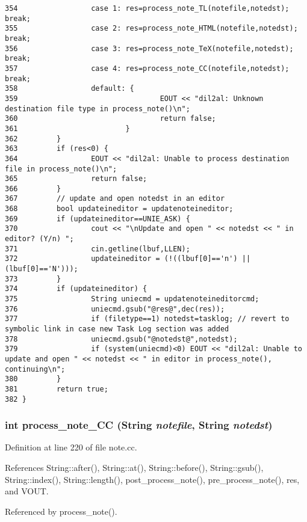 \begin{verbatim}
354                 case 1: res=process_note_TL(notefile,notedst); break;
355                 case 2: res=process_note_HTML(notefile,notedst); break;
356                 case 3: res=process_note_TeX(notefile,notedst); break;
357                 case 4: res=process_note_CC(notefile,notedst); break;
358                 default: {
359                                 EOUT << "dil2al: Unknown destination file type in process_note()\n";
360                                 return false;
361                         }
362         }
363         if (res<0) {
364                 EOUT << "dil2al: Unable to process destination file in process_note()\n";
365                 return false;
366         }
367         // update and open notedst in an editor
368         bool updateineditor = updatenoteineditor;
369         if (updateineditor==UNIE_ASK) {
370                 cout << "\nUpdate and open " << notedst << " in editor? (Y/n) ";
371                 cin.getline(lbuf,LLEN);
372                 updateineditor = (!((lbuf[0]=='n') || (lbuf[0]=='N')));
373         }
374         if (updateineditor) {
375                 String uniecmd = updatenoteineditorcmd;
376                 uniecmd.gsub("@res@",dec(res));
377                 if (filetype==1) notedst=tasklog; // revert to symbolic link in case new Task Log section was added
378                 uniecmd.gsub("@notedst@",notedst);
379                 if (system(uniecmd)<0) EOUT << "dil2al: Unable to update and open " << notedst << " in editor in process_note(), continuing\n";
380         }
381         return true;
382 }
\end{verbatim}\normalsize 
{}
\subsubsection{\setlength{\rightskip}{0pt plus 5cm}int process\_\-note\_\-CC ({\bf String} {\em notefile}, {\bf String} {\em notedst})}\label{note_8cc_a6}




Definition at line 220 of file note.cc.

References String::after(), String::at(), String::before(), String::gsub(), String::index(), String::length(), post\_\-process\_\-note(), pre\_\-process\_\-note(), res, and VOUT.

Referenced by process\_\-note().



